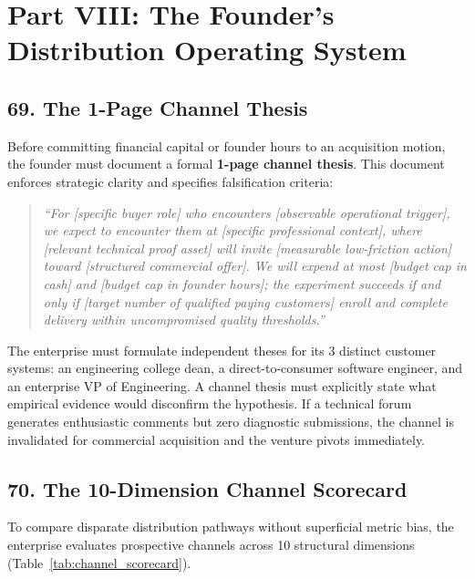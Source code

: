 \section*{Part VIII: The Founder's Distribution Operating System}

\subsection*{69. The 1-Page Channel Thesis}

Before committing financial capital or founder hours to an acquisition motion, the founder must document a formal \textbf{1-page channel thesis}. This document enforces strategic clarity and specifies falsification criteria:
\begin{quote}
\textit{``For [specific buyer role] who encounters [observable operational trigger], we expect to encounter them at [specific professional context], where [relevant technical proof asset] will invite [measurable low-friction action] toward [structured commercial offer]. We will expend at most [budget cap in cash] and [budget cap in founder hours]; the experiment succeeds if and only if [target number of qualified paying customers] enroll and complete delivery within uncompromised quality thresholds.''}
\end{quote}

The enterprise must formulate independent theses for its 3 distinct customer systems: an engineering college dean, a direct-to-consumer software engineer, and an enterprise VP of Engineering. A channel thesis must explicitly state what empirical evidence would disconfirm the hypothesis. If a technical forum generates enthusiastic comments but zero diagnostic submissions, the channel is invalidated for commercial acquisition and the venture pivots immediately.

\subsection*{70. The 10-Dimension Channel Scorecard}

To compare disparate distribution pathways without superficial metric bias, the enterprise evaluates prospective channels across 10 structural dimensions (Table~\ref{tab:channel_scorecard}).


